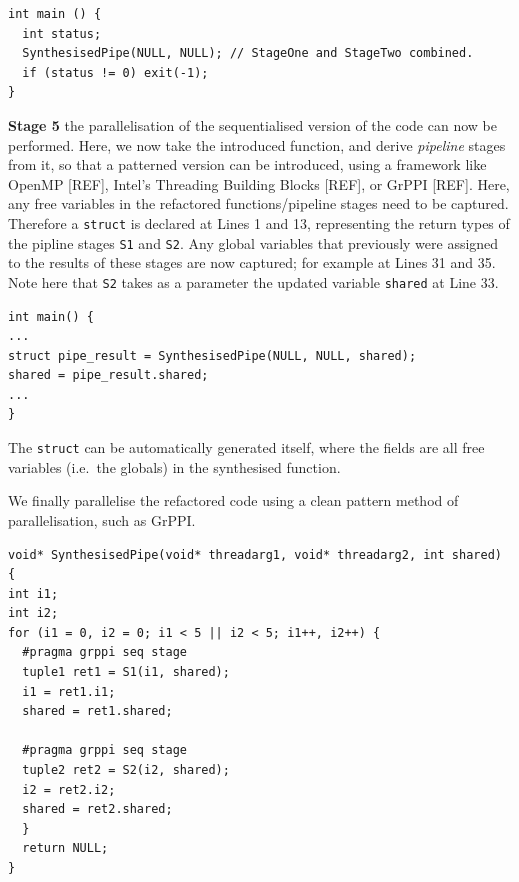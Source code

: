   \begin{lstlisting}[frame=single]
int main () {
  int status;
  SynthesisedPipe(NULL, NULL); // StageOne and StageTwo combined.
  if (status != 0) exit(-1);
}
\end{lstlisting}


\textbf{Stage 5} the parallelisation of the sequentialised version of the code can now be performed. Here, we now take the introduced function, and derive \emph{pipeline} stages from it, so that a patterned version can be introduced, using a framework like OpenMP [REF], Intel's Threading Building Blocks [REF], or GrPPI [REF]. Here, any free variables in the refactored functions/pipeline stages need to be captured. Therefore a \lstinline|struct| is declared at Lines 1 and 13, representing the return types of the pipline stages \lstinline|S1| and \lstinline|S2|. Any global variables that previously were assigned to the results of these stages are now captured; for example at Lines 31 and 35. Note here that \lstinline{S2} takes as a parameter the updated variable \lstinline{shared} at Line 33. 

\begin{lstlisting}[frame=single]
int main() {
...
struct pipe_result = SynthesisedPipe(NULL, NULL, shared);
shared = pipe_result.shared;
...
}
\end{lstlisting}
The \lstinline|struct| can be automatically generated itself, where the fields are all free variables (i.e.\ the globals) in the synthesised function.

We finally parallelise the refactored code using a clean pattern method of parallelisation, such as GrPPI.

\begin{lstlisting}[frame=single]
void* SynthesisedPipe(void* threadarg1, void* threadarg2, int shared) {
int i1;
int i2;
for (i1 = 0, i2 = 0; i1 < 5 || i2 < 5; i1++, i2++) {
  #pragma grppi seq stage
  tuple1 ret1 = S1(i1, shared);
  i1 = ret1.i1;
  shared = ret1.shared;

  #pragma grppi seq stage
  tuple2 ret2 = S2(i2, shared);
  i2 = ret2.i2;
  shared = ret2.shared;
  }
  return NULL;
}
\end{lstlisting}

